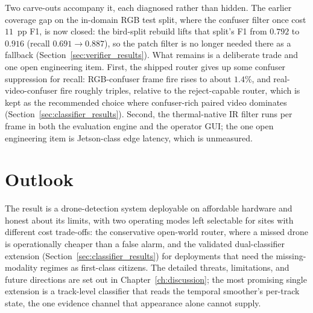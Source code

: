 Two carve-outs accompany it, each diagnosed rather than hidden. The earlier coverage gap on the in-domain RGB test split, where the confuser filter once cost $11$~pp F1, is now closed: the bird-split rebuild lifts that split's F1 from $0.792$ to $0.916$ (recall $0.691 \to 0.887$), so the patch filter is no longer needed there as a fallback (Section~\ref{sec:verifier_results}). What remains is a deliberate trade and one open engineering item. First, the shipped router gives up some confuser suppression for recall: RGB-confuser frame fire rises to about $1.4\%$, and real-video-confuser fire roughly triples, relative to the reject-capable router, which is kept as the recommended choice where confuser-rich paired video dominates (Section~\ref{sec:classifier_results}). Second, the thermal-native IR filter runs per frame in both the evaluation engine and the operator GUI; the one open engineering item is Jetson-class edge latency, which is unmeasured.

\section{Outlook}

The result is a drone-detection system deployable on affordable hardware and honest about its limits, with two operating modes left selectable for sites with different cost trade-offs: the conservative open-world router, where a missed drone is operationally cheaper than a false alarm, and the validated dual-classifier extension (Section~\ref{sec:classifier_results}) for deployments that need the missing-modality regimes as first-class citizens. The detailed threats, limitations, and future directions are set out in Chapter~\ref{ch:discussion}; the most promising single extension is a track-level classifier that reads the temporal smoother's per-track state, the one evidence channel that appearance alone cannot supply.
